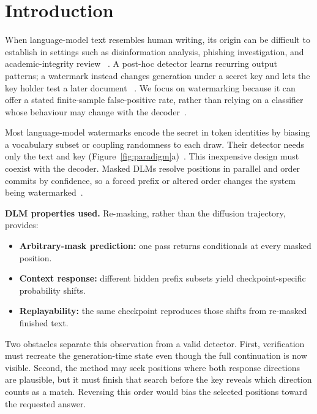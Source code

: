 \section{Introduction}
\label{sec:intro}

When language-model text resembles human writing, its origin can be difficult to establish in
settings such as disinformation analysis, phishing investigation, and academic-integrity review
~\citep{liang2026survey}. A post-hoc detector learns recurring output patterns; a watermark instead
changes generation under a secret key and lets the key holder test a later document
~\citep{petitcolas1999hiding,kirchenbauer2023watermark}. We focus on watermarking because it can
offer a stated finite-sample false-positive rate, rather than relying on a classifier whose behaviour
may change with the decoder~\citep{krishna2023paraphrasing,
jovanovic2024stealing,zhao2024provable,christ2024undetectable}.

\suppressfloats[t]


Most language-model watermarks encode the secret in token identities by biasing a vocabulary
subset or coupling randomness to each draw. Their detector needs only the text and key
(Figure~\ref{fig:paradigm}a)~\citep{kirchenbauer2023watermark,kuditipudi2024distortionfree}.
This inexpensive design must coexist with the decoder. Masked DLMs resolve positions in parallel
and order commits by confidence, so a forced prefix or altered order changes the system being
watermarked~\citep{hong2026dgmark}.

\textbf{DLM properties used.} Re-masking, rather than the diffusion trajectory, provides:
\begin{itemize}[leftmargin=1.2em,itemsep=0pt,topsep=1pt]
\item \textbf{Arbitrary-mask prediction:} one pass returns conditionals at every masked position.
\item \textbf{Context response:} different hidden prefix subsets yield checkpoint-specific probability shifts.
\item \textbf{Replayability:} the same checkpoint reproduces those shifts from re-masked finished text.
\end{itemize}

Two obstacles separate this observation from a valid detector. First, verification must recreate
the generation-time state even though the full continuation is now visible. Second, the method may
seek positions where both response directions are plausible, but it must finish that search before
the key reveals which direction counts as a match. Reversing this order would bias the selected
positions toward the requested answer.

